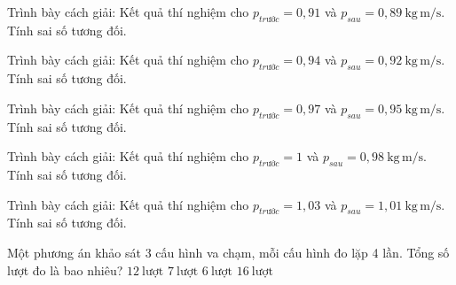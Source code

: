 \begin{bt}
Trình bày cách giải: Kết quả thí nghiệm cho $p_{trước}=0,91$ và $p_{sau}=0,89\ \mathrm{kg\,m/s}$. Tính sai số tương đối.
\end{bt}

\begin{bt}
Trình bày cách giải: Kết quả thí nghiệm cho $p_{trước}=0,94$ và $p_{sau}=0,92\ \mathrm{kg\,m/s}$. Tính sai số tương đối.
\end{bt}

\begin{bt}
Trình bày cách giải: Kết quả thí nghiệm cho $p_{trước}=0,97$ và $p_{sau}=0,95\ \mathrm{kg\,m/s}$. Tính sai số tương đối.
\end{bt}

\begin{bt}
Trình bày cách giải: Kết quả thí nghiệm cho $p_{trước}=1$ và $p_{sau}=0,98\ \mathrm{kg\,m/s}$. Tính sai số tương đối.
\end{bt}

\begin{bt}
Trình bày cách giải: Kết quả thí nghiệm cho $p_{trước}=1,03$ và $p_{sau}=1,01\ \mathrm{kg\,m/s}$. Tính sai số tương đối.
\end{bt}

\begin{ex}
Một phương án khảo sát 3 cấu hình va chạm, mỗi cấu hình đo lặp 4 lần. Tổng số lượt đo là bao nhiêu?
\choice
{\True $12\ \mathrm{lượt}$}
{$7\ \mathrm{lượt}$}
{$6\ \mathrm{lượt}$}
{$16\ \mathrm{lượt}$}
\end{ex}


